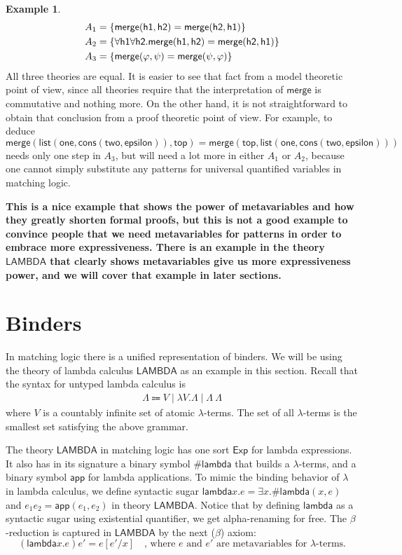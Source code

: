 \documentclass{article}
\newcommand{\comment}[1]
    {\par {\bfseries \color{blue} #1 \par}} %
\newcounter{thmcounter}
\theoremstyle{plain}
\theoremstyle{definition}
\newtheorem{example}[thmcounter]{Example}
\theoremstyle{remark}
\newcommand{\LAMBDA}{\mathsf{LAMBDA}}
\begin{document}
\begin{example}
\begin{align*}
A_1 &= \{{\sf merge(h1, h2) = merge(h2, h1)}\} \\
A_2 &= \{{\sf \forall h1 \forall h2 . merge(h1, h2) = merge(h2, h1)}\} \\
A_3 &= \{\mathsf{merge}(\varphi, \psi) = \mathsf{merge}(\psi, \varphi)\}
\end{align*}
All three theories are equal. It is easier to see that fact from a model theoretic point of view, since all theories require that the interpretation of $\mathsf{merge}$ is commutative and nothing more. On the other hand, it is not straightforward to obtain that conclusion from a proof theoretic point of view. For example, to deduce $\mathsf{merge}(\mathsf{list}(\mathsf{one}, \mathsf{cons}(\mathsf{two}, \mathsf{epsilon})), \mathsf{top}) = \mathsf{merge}(\mathsf{top}, \mathsf{list}(\mathsf{one}, \mathsf{cons}(\mathsf{two}, \mathsf{epsilon})))$ needs only one step in $A_3$, but will need a lot more in either $A_1$ or $A_2$, because one cannot simply substitute any patterns for universal quantified variables in matching logic.
\comment{This is a nice example that shows the power of metavariables and how they greatly shorten formal proofs, but this is not a good example to convince people that we need metavariables for patterns in order to embrace more expressiveness. There is an example in the theory $\LAMBDA$ that clearly shows metavariables give us more expressiveness power, and we will cover that example in later sections.}
\end{example}

\section{Binders}

In matching logic there is a unified representation of binders. We will be using the theory of lambda calculus $\LAMBDA$ as an example in this section. Recall that the syntax for untyped lambda calculus is
\begin{align*}
\Lambda \Coloneqq V \mid \lambda V . \Lambda \mid \Lambda \ \Lambda
\end{align*}
where $V$ is a countably infinite set of atomic $\lambda$-terms. The set of all $\lambda$-terms is the smallest set satisfying the above grammar.

The theory $\LAMBDA$ in matching logic has one sort $\mathsf{Exp}$ for lambda expressions. It also has in its signature a binary symbol $\mathsf{\#lambda}$ that builds a $\lambda$-terms, and a binary symbol $\mathsf{app}$ for lambda applications. To mimic the binding behavior of $\lambda$ in lambda calculus, we define syntactic sugar $\mathsf{lambda}x . e = \exists x . \mathsf{\#lambda}(x, e)$  and $e_1e_2 = \mathsf{app}(e_1, e_2)$ in theory $\LAMBDA$. Notice that by defining $\mathsf{lambda}$ as a syntactic sugar using existential quantifier, we get alpha-renaming for free. The $\beta$-reduction is captured in $\LAMBDA$ by the next ($\beta$) axiom:
\begin{equation*}
(\mathsf{lambda} x . e)e' = e[e'/x] \quad \text{, where $e$ and $e'$ are metavariables for $\lambda$-terms.}
\end{equation*}
\end{document}
